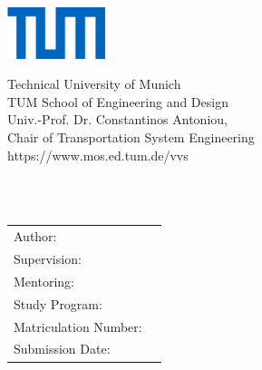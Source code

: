 
\begin{titlepage}
\begin{flushright}
    \includegraphics[height=15mm]{DefaultTemplate/Logos/TUM1.jpg}
\end{flushright}
    
\vspace{-23mm}
\begin{flushleft}
    \footnotesize{%
    Technical University of Munich\\
    TUM School of Engineering and Design\\
    Univ.-Prof. Dr. Constantinos Antoniou, \\
    Chair of Transportation System Engineering\\
    https://www.mos.ed.tum.de/vvs
    }
\end{flushleft}
\vspace{10mm}

\begin{flushleft}
  \vspace{30mm}
  {\huge\bfseries\getTitle{}}\\  
   \vspace{10mm}
   {\Large\bfseries\getsubTitle{}}\\  
  
  \vspace{80mm}

    \begin{tabular}{l l}
Author:                     &\getAuthor{} \\
Supervision:                &\getSupervisor{} \\
Mentoring:                  &\getMentor{}\\
Study Program:              &\getCourseofStudy{} \\
Matriculation Number:       &\getAuthorMatrNr{}\\
Submission Date:            &\getSubmissionDate{} \\
    \end{tabular}
\end{flushleft}

\end{titlepage}